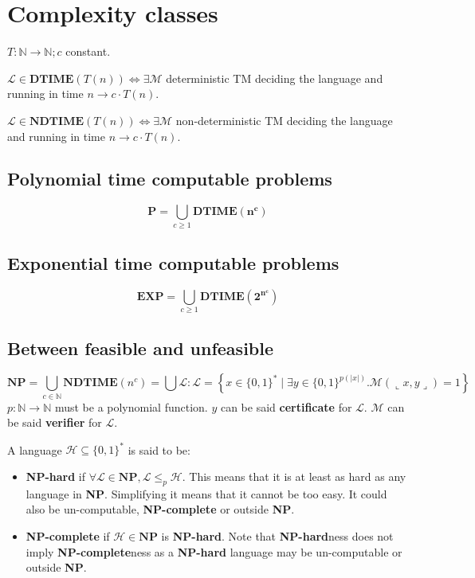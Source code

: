 \documentclass[]{article}
\begin{document}
\section{Complexity classes}

$T:\mathbb{N}\to\mathbb{N}; c $ constant. 

$\mathcal{L} \in \textbf{DTIME}(T(n)) \iff \exists \mathcal{M}$ deterministic TM deciding the language and running in time $n \rightarrow c \cdot T(n)$.

$\mathcal{L} \in \textbf{NDTIME}(T(n)) \iff \exists \mathcal{M}$ non-deterministic TM deciding the language and running in time $n \rightarrow c \cdot T(n)$.

\subsection{Polynomial time computable problems}

$$
\mathbf{P} = \bigcup\limits_{c\ge1} \mathbf{DTIME(n^c)}
$$

\subsection{Exponential time computable problems}

$$
\mathbf{EXP} = \bigcup\limits_{c\ge1} \mathbf{DTIME(2^{n^c})}
$$

\subsection{Between feasible and unfeasible}

$$
\mathbf{NP} = \bigcup\limits_{c\in\mathbb{N}} \mathbf{NDTIME}(n^c) = \bigcup\mathcal{L}: \mathcal{L}=\left\{x \in\{0,1\}^{*} \mid \exists y \in\{0,1\}^{p(|x|)} . \mathcal{M}(\llcorner x, y\lrcorner)=1\right\}
$$
$p:\mathbb{N}\to\mathbb{N}$ must be a polynomial function. $y$ can be said \textbf{certificate} for $\mathcal{L}$. $\mathcal{M}$ can be said \textbf{verifier} for $\mathcal{L}$.

A language $\mathcal{H} \subseteq \{0,1\}^*$ is said to be:

\begin{itemize}
	\item \textbf{NP-hard} if $\forall \mathcal{L} \in \mathbf{N P},   \mathcal{L} \le_p \mathcal{H}$. This means that it is at least as hard as any language in \textbf{NP}. Simplifying it means that it cannot be too easy. It could also be un-computable, \textbf{NP-complete} or outside \textbf{NP}.
	\item \textbf{NP-complete} if $\mathcal{H} \in \mathbf{N P}$ is \textbf{NP-hard}. Note that \textbf{NP-hard}ness does not imply \textbf{NP-complete}ness as a \textbf{NP-hard} language may be un-computable or outside \textbf{NP}.
\end{itemize}
\end{document}

